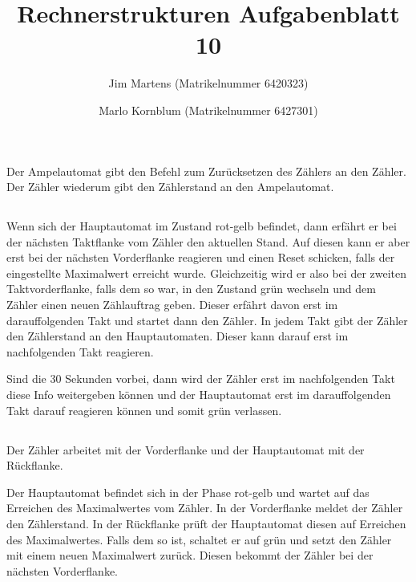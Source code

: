 \documentclass[10pt,a4paper,oneside,ngerman,numbers=noenddot]{scrartcl}
\begin{document}
\author{Jim Martens (Matrikelnummer 6420323) \and Marlo Kornblum (Matrikelnummer 6427301)}
\title{Rechnerstrukturen Aufgabenblatt 10}
\maketitle

\section{} %
\subsection{} %
Der Ampelautomat gibt den Befehl zum Zurücksetzen des Zählers an den Zähler. Der Zähler wiederum gibt den Zählerstand an den Ampelautomat.
\subsection{} %
Wenn sich der Hauptautomat im Zustand rot-gelb befindet, dann erfährt er bei der nächsten Taktflanke vom Zähler den aktuellen Stand. Auf diesen kann er aber erst bei der nächsten Vorderflanke reagieren und einen Reset schicken, falls der eingestellte Maximalwert erreicht wurde. 
Gleichzeitig wird er also bei der zweiten Taktvorderflanke, falls dem so war, in den Zustand grün wechseln und dem Zähler einen neuen Zählauftrag geben. Dieser erfährt davon erst im darauffolgenden Takt und startet dann den Zähler.
In jedem Takt gibt der Zähler den Zählerstand an den Hauptautomaten. Dieser kann darauf erst im nachfolgenden Takt reagieren.

Sind die $30$ Sekunden vorbei, dann wird der Zähler erst im nachfolgenden Takt diese Info weitergeben können und der Hauptautomat erst im darauffolgenden Takt darauf reagieren können und somit grün verlassen.
\subsection{} %
Der Zähler arbeitet mit der Vorderflanke und der Hauptautomat mit der Rückflanke.

Der Hauptautomat befindet sich in der Phase rot-gelb und wartet auf das Erreichen des Maximalwertes vom Zähler. In der Vorderflanke meldet der Zähler den Zählerstand. In der Rückflanke prüft der Hauptautomat diesen auf Erreichen des Maximalwertes. Falls dem so ist, schaltet er auf grün und setzt den Zähler mit einem neuen Maximalwert zurück. Diesen bekommt der Zähler bei der nächsten Vorderflanke.
\end{document}
